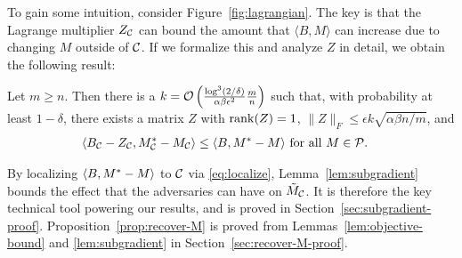 
To gain some intuition, consider 
Figure~\ref{fig:lagrangian}. The key is that the Lagrange 
multiplier $Z_{\mathcal{C}}$ can bound the amount that $\langle B, M \rangle$ 
can increase due to changing $M$ outside of $\mathcal{C}$.
If we formalize this and analyze $Z$ in detail, we obtain the 
following result:
\begin{lemma}
\label{lem:subgradient}
Let $m \geq n$. Then there is a $k = \mathcal{O}\left( \frac{\log^3(2/\delta)}{\alpha\beta\epsilon^2}\frac{m}{n} \right)$ 
such that, with probability at least $1-\delta$, there exists a matrix $Z$ with 
$\operatorname{rank}(Z) = 1$, $\|Z\|_F \leq \epsilon k\sqrt{\alpha\beta n/m}$, and
\begin{align}
\label{eq:localize}
\langle B_{\mathcal{C}} - Z_{\mathcal{C}}, M^*_{\mathcal{C}} - M_{\mathcal{C}} \rangle &\leq \langle B, M^* - M \rangle \text{ for all $M \in \mathcal{P}$}.
\end{align}
\end{lemma}
By localizing $\langle B, M^* - M \rangle$ to $\mathcal{C}$ via 
\eqref{eq:localize}, 
Lemma~\ref{lem:subgradient} bounds the effect that the adversaries can have 
on $\tilde{M}_{\mathcal{C}}$. It is therefore the key 
technical tool powering our results, and is proved in 
Section~\ref{sec:subgradient-proof}. Proposition~\ref{prop:recover-M} 
is proved from Lemmas~\ref{lem:objective-bound} and \ref{lem:subgradient} 
in Section~\ref{sec:recover-M-proof}.

